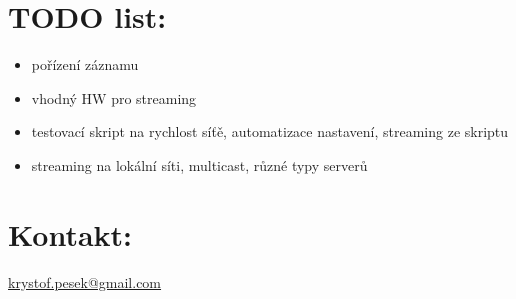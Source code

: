 \documentclass[11pt]{article} %
\begin{document}
\section{TODO list:}
\begin{itemize}
\item{pořízení záznamu}
\item{vhodný HW pro streaming}
\item{testovací skript na rychlost síťě, automatizace nastavení, streaming ze skriptu}
\item{streaming na lokální síti, multicast, různé typy serverů}
\end{itemize}



\section{Kontakt:}
\href{mailto:krystof.pesek@gmail.com}{krystof.pesek@gmail.com}
\end{document}
